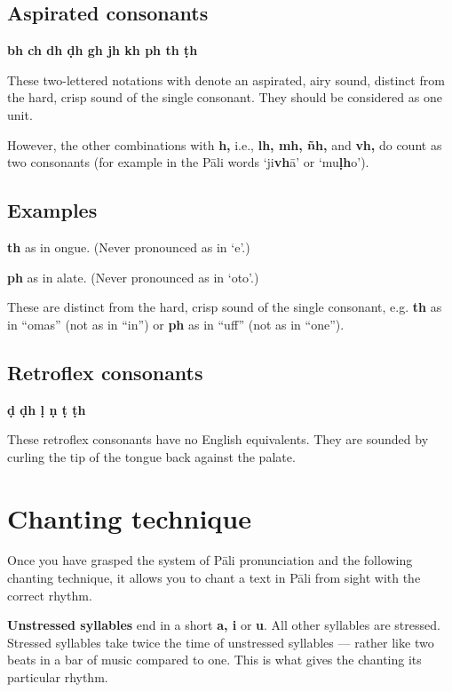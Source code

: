 \subsection{Aspirated consonants}

\textbf{bh ch dh ḍh gh jh kh ph th ṭh}

These two-lettered notations with  denote an aspirated, airy sound,
distinct from the hard, crisp sound of the single consonant. They should be
considered as one unit.

However, the other combinations with \textbf{h,} i.e., \textbf{lh, mh, ñh,} and
\textbf{vh,} do count as two consonants (for example in the Pāli words
‘ji\textbf{vh}ā’ or ‘mu\textbf{ḷh}o’).

\subsection{Examples}

\textbf{th} as  in ongue. (Never pronounced as in `e'.)

\textbf{ph} as  in alate. (Never pronounced as in `oto'.)

These are distinct from the hard, crisp sound of the single consonant, e.g.
\textbf{th} as in “omas” (not as in “in”) or \textbf{ph} as
in “uff” (not as in “one”).

\subsection{Retroflex consonants}

\textbf{ḍ ḍh ḷ ṇ ṭ ṭh}

These retroflex consonants have no English equivalents. They are sounded
by curling the tip of the tongue back against the palate.

\section{Chanting technique}

Once you have grasped the system of Pāli pronunciation and the following
chanting technique, it allows you to chant a text in Pāli from sight
with the correct rhythm.

\textbf{Unstressed syllables} end in a short \textbf{a, i} or
\textbf{u}. All other syllables are stressed. Stressed syllables take
twice the time of unstressed syllables --- rather like two beats in a bar
of music compared to one. This is what gives the chanting its particular
rhythm.

